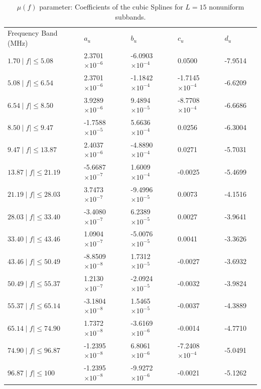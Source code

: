 \documentclass[journal]{IEEEtran}
\begin{document}
\begin{table}[h]
	\setlength\extrarowheight{4.5pt}
	\centering
	\vspace*{-5mm}
	\caption{$\mu(f)$ parameter: Coefficients of the cubic Splines for  $L=15$  nonuniform subbands.}
	\label{table_alfasW}
	\begin{tabular}{|C{3.5cm}|C{2.5cm}|C{2.5cm}|C{2.5cm}|C{2.5cm}|m{0cm}}
		Frequency Band (MHz)           		   & $a_u$    			  	  & $b_u$	      			  & $c_u$  	 		 		 & $d_u$&\\ 
		$1.70 \mid f\mid \leq 5.08$   & 2.3701  $\times 10^{-6}$ & -6.0903 $\times 10^{-4}$  & 0.0500 					 & -7.9514 &\\ 
		$5.08 \mid f\mid \leq 6.54$   & 2.3701  $\times 10^{-6}$ & -1.1842 $\times 10^{-4}$  & -1.7145 $\times 10^{-4}$ & -6.6209 &\\ 
		$6.54 \mid f\mid \leq 8.50$   & 3.9289  $\times 10^{-6}$ & 9.4894  $\times 10^{-5}$  & -8.7708 $\times 10^{-4}$ & -6.6686 &\\ 
		$8.50 \mid f\mid \leq 9.47$   & -1.7588 $\times 10^{-5}$ & 5.6636  $\times 10^{-4}$  & 0.0256                   & -6.3004 &\\ 
		$9.47 \mid f\mid \leq 13.87$  & 2.4037  $\times 10^{-6}$ & -4.8890 $\times 10^{-4}$  & 0.0271					 & -5.7031 &\\ 
		$13.87 \mid f\mid \leq 21.19$ & -5.6687 $\times 10^{-7}$ & 1.6009  $\times 10^{-4}$  & -0.0025		    		 & -5.4699 &\\ 
		$21.19 \mid f\mid \leq 28.03$ & 3.7473  $\times 10^{-7}$ & -9.4996 $\times 10^{-5}$  & 0.0073  				 & -4.1516 &\\ 
		$28.03 \mid f\mid \leq 33.40$ & -3.4080 $\times 10^{-7}$ & 6.2389  $\times 10^{-5}$  & 0.0027 					 & -3.9641 &\\ 
		$33.40 \mid f\mid \leq 43.46$ & 1.0904  $\times 10^{-7}$ & -5.0076 $\times 10^{-5}$  & 0.0041  				 & -3.3626 &\\ 
		$43.46 \mid f\mid \leq 50.49$ & -8.8509 $\times 10^{-8}$ & 1.7312  $\times 10^{-5}$  & -0.0027					 & -3.6932 &\\ 
		$50.49 \mid f\mid \leq 55.37$ & 1.2130  $\times 10^{-7}$ & -2.0924 $\times 10^{-5}$  & -0.0032  				 & -3.9824 &\\ 
		$55.37 \mid f\mid \leq 65.14$ & -3.1804 $\times 10^{-8}$ & 1.5465  $\times 10^{-5}$  & -0.0037 				 & -4.3889 &\\ 
		$65.14 \mid f\mid \leq 74.90$ & 1.7372  $\times 10^{-8}$ & -3.6169 $\times 10^{-6}$  & -0.0014  			     & -4.7710 &\\ 
		$74.90 \mid f\mid \leq 96.87$ & -1.2395 $\times 10^{-8}$ & 6.8061  $\times 10^{-6}$  & -7.2408 $\times 10^{-4}$ & -5.0491 &\\ 
		$96.87 \mid f\mid \leq 100$   & -1.2395 $\times 10^{-8}$ & -9.9272 $\times 10^{-6}$  & -0.0021 				 & -5.1262 &\\ 
	\end{tabular}
\end{table}
\end{document}

